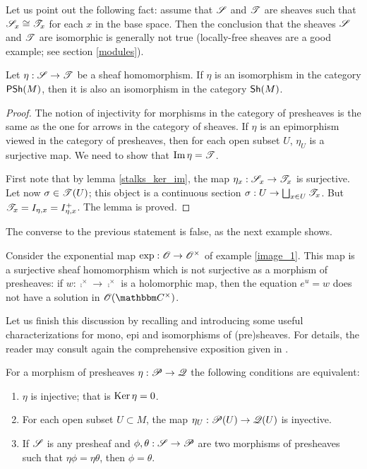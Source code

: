 Let us point out the following fact: assume that $\mathscr{S}$ and $\mathscr{T}$ are sheaves such that $\mathscr{S}_x\cong \mathscr{T}_x$ for each $x$ in the base space. Then the conclusion that the sheaves $\mathscr{S}$ and $\mathscr{T}$ are isomorphic is generally not true (locally-free sheaves are a good example; see section \ref{modules}).

\begin{lemma}
Let $\eta :\mathscr{S}\to \mathscr{T}$ be a sheaf homomorphism. If $\eta$ is an isomorphism in the category $\mathsf{PSh}(M)$, then it is also an isomorphism in the category $\mathsf{Sh}(M)$.
\end{lemma}
\begin{proof}
The notion of injectivity for morphisms in the category of presheaves is the same as the one for arrows in the category of sheaves. If $\eta$ is an epimorphism viewed in the category of presheaves, then for each open subset $U$, $\eta_U$ is a surjective map. We need to show that $\operatorname{Im}\eta =\mathscr{T}$.

First note that by lemma \ref{stalks_ker_im}, the map $\eta_x:\mathscr{S}_x\to \mathscr{T}_x$ is surjective. Let now $\sigma \in \mathscr{T}(U)$; this object is a continuous section $\sigma :U\to \bigsqcup_{x\in U}\mathscr{T}_x$. But $\mathscr{T}_x=I_{\eta ,x}=I^+_{\eta ,x}$. The lemma is proved.
\end{proof}

The converse to the previous statement is false, as the next example shows.

\begin{ej}\label{image_2}
Consider the exponential map $\operatorname{exp}:\mathscr{O}\to \mathscr{O}^{\times}$ of example \ref{image_1}. This map is a surjective sheaf homomorphism which is not surjective as a morphism of presheaves: if $w:\comp^\times \to \comp^{\times}$ is a holomorphic map, then the equation $e^u=w$ does not have a solution in $\scr{O}(\comp^{\times})$.
\end{ej}

Let us finish this discussion by recalling and introducing some useful characterizations for mono, epi and isomorphisms of (pre)sheaves. For details, the reader may consult again the comprehensive exposition given in \cite{tennison:_sheaf}.

\begin{theorem}
For a morphism of presheaves $\eta :\mathscr{P}\to \mathscr{Q}$ the following conditions are equivalent:
\begin{enumerate}
\item $\eta$ is injective; that is $\operatorname{Ker}\eta=0$.
\item For each open subset $U\subset M$, the map $\eta_U:\mathscr{P}(U)\to \mathscr{Q}(U)$ is inyective.
\item If $\mathscr{S}$ is any presheaf and $\phi ,\theta :\mathscr{S}\to \mathscr{P}$ are two morphisms of presheaves such that $\eta \phi =\eta \theta$, then $\phi =\theta$.
\end{enumerate}
\end{theorem}

